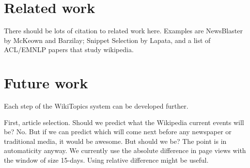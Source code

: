 \documentclass[11pt]{article}
\newcommand{\war}[1]{{\sf\small #1}}
\begin{document}
%
%
%
%
%
%
%


\section{Related work}
\label{sec:related-work}

There should be lots of citation to related work here. Examples are NewsBlaster by McKeown and Barzilay; Snippet Selection by Lapata, and a list of ACL/EMNLP papers that study wikipedia.

\section{Future work}

Each step of the WikiTopics system can be developed further.

First, article selection.
Should we predict what the Wikipedia current events will be?
No.
But if we can predict which will come next before any newspaper or traditional media, it would be awesome.
But should we be? The point is in automaticity anyway.
We currently use the absolute difference in page views with the window of size 15-days.
Using relative difference might be useful.
\end{document}
